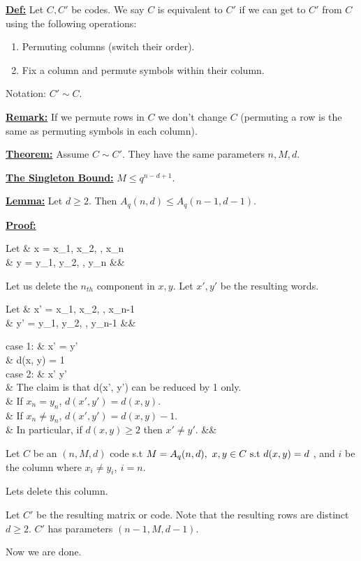 \documentclass{article}
\renewcommand{\b}[1]{\textbf{#1}}
\newcommand{\ul}[1]{\underline{#1}}
\newcommand{\laligned}[1]{
	\begin{flalign*}
		#1 &&
	\end{flalign*}
}
\newcommand{\newdef}[2]{\b{\ul{#1:}} #2}
\newcommand{\st}{\textnormal{ s.t }}
\begin{document}
\newdef{Def}{
	Let $C, C'$ be codes. We say $C$ is equivalent to $C'$ if we can get to
	$C'$ from $C$ using the following operations:

	\begin{enumerate}
		\item Permuting columns (switch their order).
		\item Fix a column and permute symbols within their column.
	\end{enumerate}

	Notation: $C' \sim C$.
}

\newdef{Remark}{
	If we permute rows in $C$ we don't change $C$ (permuting a row is the
	same as permuting symbols in each column).
}

\newdef{Theorem}{Assume $C \sim C'$. They have the same parameters $n, M, d$.}

\newdef{The Singleton Bound}{$M \leq q^{n - d + 1}$}.

\newdef{Lemma}{Let $d \geq 2$. Then $A_q(n, d) \leq A_q(n - 1, d - 1)$.}

\newdef{Proof}{
	\laligned{
		\textnormal{Let } & x = x_1, x_2, \cdots, x_n \\
		& y = y_1, y_2, \cdots, y_n
	}
	Let us delete the $n_{th}$ component in $x, y$. Let $x', y'$ be the
	resulting words.
	\laligned{
		\textnormal{Let } & x' = x_1, x_2, \cdots, x_{n-1} \\
		& y' = y_1, y_2, \cdots, y_{n-1}
	}
	\laligned{
		\textnormal{case 1: } & x' = y' \\
		& d(x, y) = 1 \\
		\textnormal{case 2: } & x' \neq y' \\
		& \textnormal{The claim is that } d(x', y') \textnormal{
			can be reduced by 1 only.} \\
		& \textnormal{If $x_n = y_n$, $d(x', y') = d(x, y)$.} \\
		& \textnormal{If $x_n \neq y_n$, $d(x', y') = d(x, y) - 1$.} \\
		& \textnormal{In particular, if $d(x, y) \geq 2$ then
			$x' \neq y'$.}
	}
}

Let $C$ be an $(n, M, d)$ code \st $M = A_q(n, d),\ x, y \in C \st d(x, y) = d$
, and $i$ be the column where $x_i \neq y_i,\ i = n$.

Lets delete this column.

Let $C'$ be the resulting matrix or code. Note that the resulting rows are
distinct $d \geq 2$. $C'$ has parameters $(n-1, M, d-1)$.

Now we are done.
\end{document}
